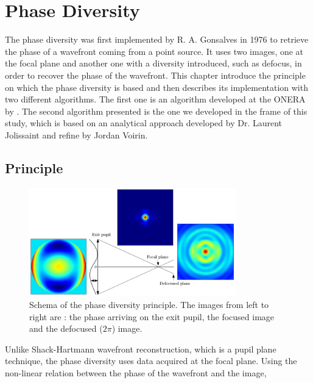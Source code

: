 \chapter{Phase Diversity}
\label{ch:PDThe}

The phase diversity was first implemented by R. A. Gonsalves in 1976 \citep{Gonsalves_1976,Gonsalves_1982} to retrieve the phase of a wavefront coming from a point source. It uses two images, one at the focal plane and another one with a diversity introduced, such as defocus, in order to recover the phase of the wavefront. This chapter introduce the principle on which the phase diversity is based and then describes its implementation with two different algorithms. The first one is an algorithm developed at the ONERA by \citet{mugnier_2006}. The second algorithm presented is the one we developed in the frame of this study, which is based on an analytical approach developed by Dr. Laurent Jolissaint and refine by Jordan Voirin.

\section{Principle}
\label{sec:principle}

\begin{figure}
\begin{center}
\includegraphics[width=0.8\textwidth,angle=0]{Figures/DiversityPrincipleM}
\decoRule
\caption{Schema of the phase diversity principle. The images from left to right are : the phase arriving on the exit pupil, the focused image and the defocused ($2\pi$) image.}
\label{fig:DiversityPrinciple}
\end{center}
\end{figure}

Unlike Shack-Hartmann wavefront reconstruction, which is a pupil plane technique, the phase diversity uses data acquired at the focal plane. Using the non-linear relation between the phase of the wavefront and the image, 

